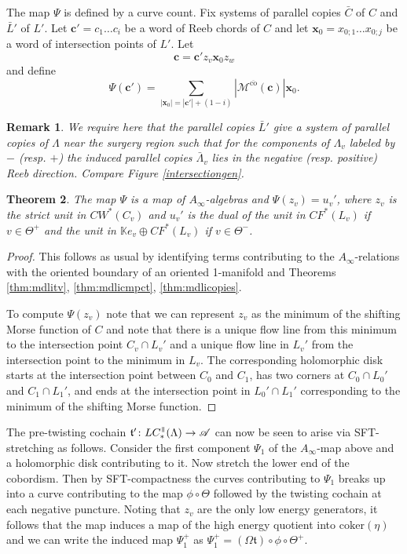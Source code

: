 \documentclass{gtpart}
\newtheorem{thm}{Theorem}
\newtheorem{rem}[thm]{Remark}
\renewcommand{\t}{\mathfrak{t}}
\newcommand{\A}{\mathscr{A}}
\renewcommand{\co}{\mathrm{co}}
\renewcommand{\parallel}{{\mkern3mu\vphantom{\perp}\vrule depth 0pt\mkern2mu\vrule depth
0pt\mkern3mu}}
\begin{document}
The map $\Psi$ is defined by a curve count. Fix systems of parallel copies $\bar C$ of $C$ and $\bar L'$ of $L'$. Let $\mathbf{c}'=c_{1}\dots c_{i}$ be a word of Reeb chords of $C$ and let $\mathbf{x}_{0}=x_{0;1}\dots x_{0;j}$ be a word of intersection points of $L'$. Let 
\[ 
\mathbf{c}=\mathbf{c}' z_{v}\mathbf{x}_{0} z_{w}
\]
and define
\[ 
\Psi(\mathbf{c}')=\sum_{|\mathbf{x}_{0}|=|\mathbf{c}'|+(1-i)}
|\mathcal{M}^{\overline{\co}}(\mathbf{c})|\mathbf{x}_{0}.
\]

\begin{rem}\label{r:inducednegparallel}
We require here that the parallel copies $\bar L'$ give a system of parallel copies of $\Lambda$ near the surgery region such that for the components of $\Lambda_{v}$ labeled by $-$ (resp. $+$) the induced parallel copies $\bar\Lambda_{v}$ lies in the negative (resp. positive) Reeb direction. Compare Figure \ref{intersectiongen}.
\end{rem}

\begin{thm}
	The map $\Psi$ is a map of $A_{\infty}$-algebras and $\Psi(z_{v})=u_{v}'$, where $z_{v}$ is the strict unit in $CW^{\ast}(C_{v})$ and $u_{v}'$ is the dual of the unit in $CF^{*}(L_{v})$ if $v\in\Theta^{+}$ and the unit in $\mathbb{K}e_{v}\oplus CF^{\ast}(L_{v})$ if $v\in \Theta^{-}$.
\end{thm}

\begin{proof}
	This follows as usual by identifying terms contributing to the $A_{\infty}$-relations with the oriented boundary of an oriented 1-manifold and Theorems \ref{thm:mdlitv}, \ref{thm:mdlicmpct}, \ref{thm:mdlicopies}.   
	
	To compute $\Psi(z_{v})$ note that we can represent $z_{v}$ as the minimum of the shifting Morse function of $C$ and note that there is a unique flow line from this minimum to the intersection point $C_{v}\cap L_{v}'$ and a unique flow line in $L_{v}'$ from the intersection point to the minimum in $L_{v}$. The corresponding holomorphic disk starts at the intersection point between $C_{0}$ and $C_{1}$, has two corners at $C_{0}\cap L_{0}'$ and $C_{1}\cap L_{1}'$, and ends at the intersection point in $L_{0}'\cap L_{1}'$ corresponding to the minimum of the shifting Morse function. 
\end{proof}

The pre-twisting cochain $\t'\colon LC_{\ast}^{\parallel}(\Lambda)\to\A$ can now be seen to arise via SFT-stretching as follows. Consider the first component $\Psi_{1}$ of the $A_{\infty}$-map above and a holomorphic disk contributing to it. Now stretch the lower end of the cobordism. Then by SFT-compactness the curves contributing to $\Psi_{1}$ breaks up into a curve contributing to the map $\phi\circ \Theta$ followed by the twisting cochain at each negative puncture. Noting that $z_{v}$ are the only low energy generators, it follows that the map induces a map of the high energy quotient into $\mathrm{coker}(\eta)$ and we can write the induced map $\Psi_{1}^{+}$ as $\Psi_{1}^{+}=(\Omega\t)\circ\phi\circ\Theta^{+}$.
\end{document}
